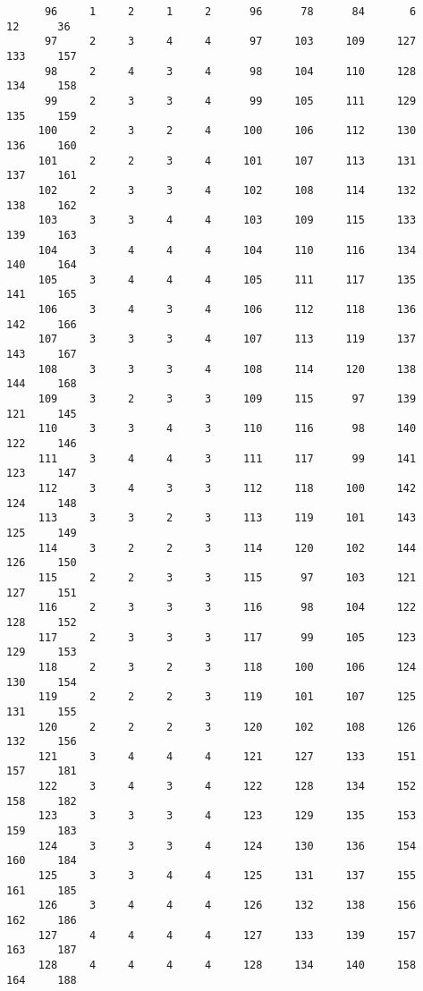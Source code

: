 \begin{verbatim}
      96     1     2     1     2      96      78      84       6      12      36
      97     2     3     4     4      97     103     109     127     133     157
      98     2     4     3     4      98     104     110     128     134     158
      99     2     3     3     4      99     105     111     129     135     159
     100     2     3     2     4     100     106     112     130     136     160
     101     2     2     3     4     101     107     113     131     137     161
     102     2     3     3     4     102     108     114     132     138     162
     103     3     3     4     4     103     109     115     133     139     163
     104     3     4     4     4     104     110     116     134     140     164
     105     3     4     4     4     105     111     117     135     141     165
     106     3     4     3     4     106     112     118     136     142     166
     107     3     3     3     4     107     113     119     137     143     167
     108     3     3     3     4     108     114     120     138     144     168
     109     3     2     3     3     109     115      97     139     121     145
     110     3     3     4     3     110     116      98     140     122     146
     111     3     4     4     3     111     117      99     141     123     147
     112     3     4     3     3     112     118     100     142     124     148
     113     3     3     2     3     113     119     101     143     125     149
     114     3     2     2     3     114     120     102     144     126     150
     115     2     2     3     3     115      97     103     121     127     151
     116     2     3     3     3     116      98     104     122     128     152
     117     2     3     3     3     117      99     105     123     129     153
     118     2     3     2     3     118     100     106     124     130     154
     119     2     2     2     3     119     101     107     125     131     155
     120     2     2     2     3     120     102     108     126     132     156
     121     3     4     4     4     121     127     133     151     157     181
     122     3     4     3     4     122     128     134     152     158     182
     123     3     3     3     4     123     129     135     153     159     183
     124     3     3     3     4     124     130     136     154     160     184
     125     3     3     4     4     125     131     137     155     161     185
     126     3     4     4     4     126     132     138     156     162     186
     127     4     4     4     4     127     133     139     157     163     187
     128     4     4     4     4     128     134     140     158     164     188

\end{verbatim}
